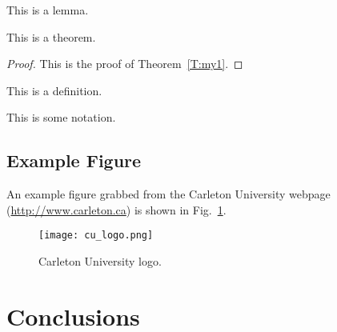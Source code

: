 \documentclass[12pt,draft]{report}
\begin{document}
\begin{lemma} 
This is a lemma.
\end{lemma}

\begin{theorem} \label{T:my1}
This is a theorem.
\end{theorem}


\begin{proof}
This is the proof of Theorem~\ref{T:my1}.
\end{proof}


\begin{definition}
This is a definition.
\end{definition}

\begin{notation}
This is some notation.
\end{notation}


\section{Example Figure}

An example figure grabbed from the Carleton University webpage (\url{http://www.carleton.ca}) is shown in Fig.~\ref{fig-culogo}.
  \begin{figure}[hbt]
   \begin{center}
     \texttt{[image: cu\_logo.png]}
   \end{center}
  \caption{Carleton University logo.}
  \label{fig-culogo}
  \end{figure}
  





\chapter{Conclusions}
\end{document}
